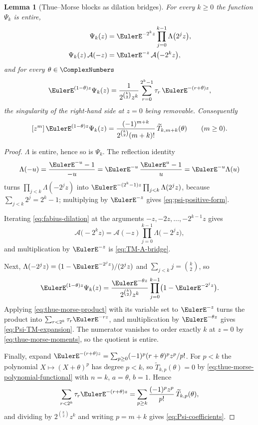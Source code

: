 \documentclass[11pt,a4paper,oneside,openany]{book}
\newtheorem{lemma}[lemma]{Lemma}
\theoremstyle{definition}
\theoremstyle{remark}
\begin{document}
\begin{lemma}[Thue--Morse blocks as dilation bridges]\label{lem:thue-morse-dilation-bridge}
For every $k\ge0$ the function $\Psi_k$ is entire,
\begin{align}
 \Psi_k(z)&=\EulerE^{-2^kz}\prod_{j=0}^{k-1}\Lambda\bigl(2^jz\bigr),
 \label{eq:psi-positive-form}\\
 \Psi_k(z)\,\mathcal A(-z)&=\EulerE^{-z}\,\mathcal A\bigl(-2^kz\bigr),
 \label{eq:TM-A-bridge}
\end{align}
and for every $\theta\in\ComplexNumbers$
\begin{equation}\label{eq:Psi-TM-expansion}
 \EulerE^{(1-\theta)z}\Psi_k(z)
 =\frac1{2^{\binom k2}z^k}\sum_{r=0}^{2^k-1}\tau_r\,\EulerE^{-(r+\theta)z},
\end{equation}
the singularity of the right-hand side at $z=0$ being removable.  Consequently
\begin{equation}\label{eq:Psi-coefficients}
 [z^m]\,\EulerE^{(1-\theta)z}\Psi_k(z)
 =\frac{(-1)^{m+k}}{2^{\binom k2}(m+k)!}\,\widetilde T_{k,m+k}(\theta)
 \qquad(m\ge0).
\end{equation}
\end{lemma}

\begin{proof}
$\Lambda$ is entire, hence so is $\Psi_k$.  The reflection identity
\[
 \Lambda(-u)=\frac{\EulerE^{-u}-1}{-u}=\EulerE^{-u}\,\frac{\EulerE^{u}-1}{u}=\EulerE^{-u}\Lambda(u)
\]
turns $\prod_{j<k}\Lambda(-2^jz)$ into $\EulerE^{-(2^k-1)z}\prod_{j<k}\Lambda(2^jz)$, because
$\sum_{j<k}2^j=2^k-1$; multiplying by $\EulerE^{-z}$ gives \eqref{eq:psi-positive-form}.

Iterating \eqref{eq:fabius-dilation} at the arguments $-z,-2z,\ldots,-2^{k-1}z$ gives
\[
 \mathcal A\bigl(-2^kz\bigr)=\mathcal A(-z)\prod_{j=0}^{k-1}\Lambda\bigl(-2^jz\bigr),
\]
and multiplication by $\EulerE^{-z}$ is \eqref{eq:TM-A-bridge}.

Next, $\Lambda(-2^jz)=(1-\EulerE^{-2^jz})/(2^jz)$ and $\sum_{j<k}j=\binom k2$, so
\[
 \EulerE^{(1-\theta)z}\Psi_k(z)
 =\frac{\EulerE^{-\theta z}}{2^{\binom k2}z^k}
  \prod_{j=0}^{k-1}\bigl(1-\EulerE^{-2^jz}\bigr).
\]
Applying \eqref{eq:thue-morse-product} with its variable set to $\EulerE^{-z}$ turns the
product into $\sum_{r<2^k}\tau_r\EulerE^{-rz}$, and multiplication by $\EulerE^{-\theta z}$ gives
\eqref{eq:Psi-TM-expansion}.  The numerator vanishes to order exactly $k$ at $z=0$ by
\eqref{eq:thue-morse-moments}, so the quotient is entire.

Finally, expand $\EulerE^{-(r+\theta)z}=\sum_{p\ge0}(-1)^p(r+\theta)^pz^p/p!$.  For $p<k$ the
polynomial $X\mapsto(X+\theta)^p$ has degree $p<k$, so
$\widetilde T_{k,p}(\theta)=0$ by \eqref{eq:thue-morse-polynomial-functional} with $n=k$,
$a=\theta$, $b=1$.  Hence
\[
 \sum_{r<2^k}\tau_r\EulerE^{-(r+\theta)z}
 =\sum_{p\ge k}\frac{(-1)^pz^p}{p!}\,\widetilde T_{k,p}(\theta),
\]
and dividing by $2^{\binom k2}z^k$ and writing $p=m+k$ gives \eqref{eq:Psi-coefficients}.
\end{proof}
\end{document}
